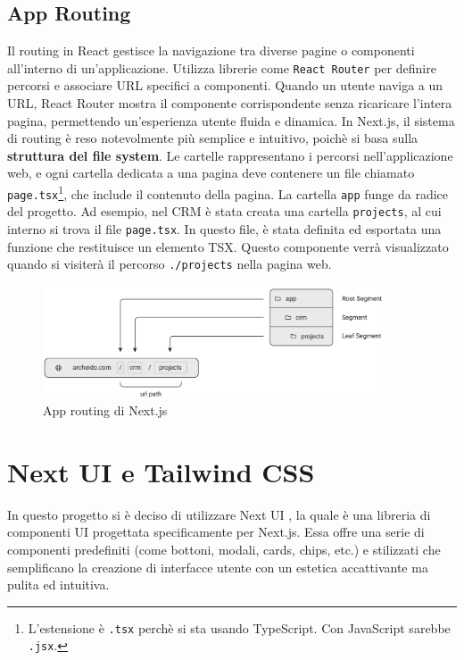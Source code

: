 \documentclass[target=bach,aauheader=,style=]{thud}
\begin{document}
\subsection{App Routing}
Il routing in React gestisce la navigazione tra diverse pagine o componenti all'interno di un'applicazione. Utilizza librerie come \texttt{React Router} per definire percorsi e associare URL specifici a componenti. Quando un utente naviga a un URL, React Router mostra il componente corrispondente senza ricaricare l'intera pagina, permettendo un'esperienza utente fluida e dinamica. In Next.js, il sistema di routing è reso notevolmente più semplice e intuitivo, poichè si basa sulla \textbf{struttura del file system}. Le cartelle rappresentano i percorsi nell'applicazione web, e ogni cartella dedicata a una pagina deve contenere un file chiamato \texttt{page.tsx}\footnote{L'estensione è \texttt{.tsx} perchè si sta usando TypeScript. Con JavaScript sarebbe \texttt{.jsx}.}, che include il contenuto della pagina. La cartella \texttt{app} funge da radice del progetto. Ad esempio, nel CRM è stata creata una cartella \texttt{projects}, al cui interno si trova il file \texttt{page.tsx}. In questo file, è stata definita ed esportata una funzione che restituisce un elemento TSX. Questo componente verrà visualizzato quando si visiterà il percorso \texttt{./projects} nella pagina web.

\begin{figure}[H]
    \centering
    \includegraphics[width=0.9\textwidth]{img/routing.pdf} 
    \caption{App routing \cite{nextjsdocs2024} di Next.js}
\end{figure}



\section{Next UI e Tailwind CSS}
In questo progetto si è deciso di utilizzare Next UI \cite{nextui2024}, la quale è una libreria di componenti UI progettata specificamente per Next.js. Essa offre una serie di componenti predefiniti (come bottoni, modali, cards, chips, etc.) e stilizzati che semplificano la creazione di interfacce utente con un estetica accattivante ma pulita ed intuitiva. 
\end{document}
